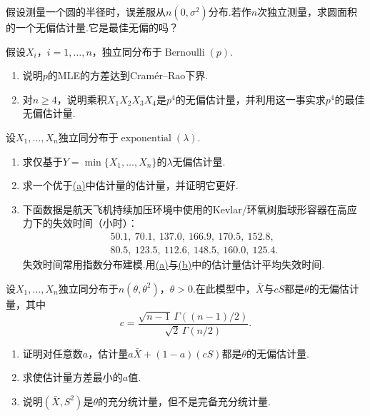\begin{exercise}\label{exercise:7.47}
假设测量一个圆的半径时，误差服从$n(0,\sigma^2)$分布.若作$n$次独立测量，求圆面积的一个无偏估计量.它是最佳无偏的吗？
\end{exercise}
\begin{exercise}\label{exercise:7.48}
假设$X_i$，$i=1,\ldots,n$，独立同分布于$\operatorname{Bernoulli}(p)$.
\begin{enumerate}[label=(\alph*)]
\item 说明$p$的MLE的方差达到Cramér--Rao下界.
\item 对$n\ge4$，说明乘积$X_1X_2X_3X_4$是$p^4$的无偏估计量，并利用这一事实求$p^4$的最佳无偏估计量.
\end{enumerate}
\end{exercise}
\begin{exercise}\label{exercise:7.49}
设$X_1,\ldots,X_n$独立同分布于$\operatorname{exponential}(\lambda)$.
\begin{enumerate}[label=(\alph*)]
\item{}\label{itm:exercise:7.49:a} 求仅基于$Y=\min\{X_1,\ldots,X_n\}$的$\lambda$无偏估计量.
\item{}\label{itm:exercise:7.49:b} 求一个优于\hyperref[itm:exercise:7.49:a]{(a)}中估计量的估计量，并证明它更好.
\item 下面数据是航天飞机持续加压环境中使用的Kevlar/环氧树脂球形容器在高应力下的失效时间（小时）：
\begin{gather*}
50.1,\ 70.1,\ 137.0,\ 166.9,\ 170.5,\ 152.8,\\
80.5,\ 123.5,\ 112.6,\ 148.5,\ 160.0,\ 125.4.
\end{gather*}
失效时间常用指数分布建模.用\hyperref[itm:exercise:7.49:a]{(a)}与\hyperref[itm:exercise:7.49:b]{(b)}中的估计量估计平均失效时间.
\end{enumerate}
\end{exercise}
\begin{exercise}\label{exercise:7.50}
设$X_1,\ldots,X_n$独立同分布于$n(\theta,\theta^2)$，$\theta>0$.在此模型中，$\bar X$与$cS$都是$\theta$的无偏估计量，其中
$$c=\frac{\sqrt{n-1}\,\Gamma((n-1)/2)}{\sqrt2\,\Gamma(n/2)}.$$
\begin{enumerate}[label=(\alph*)]
\item 证明对任意数$a$，估计量$a\bar X+(1-a)(cS)$都是$\theta$的无偏估计量.
\item 求使估计量方差最小的$a$值.
\item 说明$(\bar X,S^2)$是$\theta$的充分统计量，但不是完备充分统计量.
\end{enumerate}
\end{exercise}
